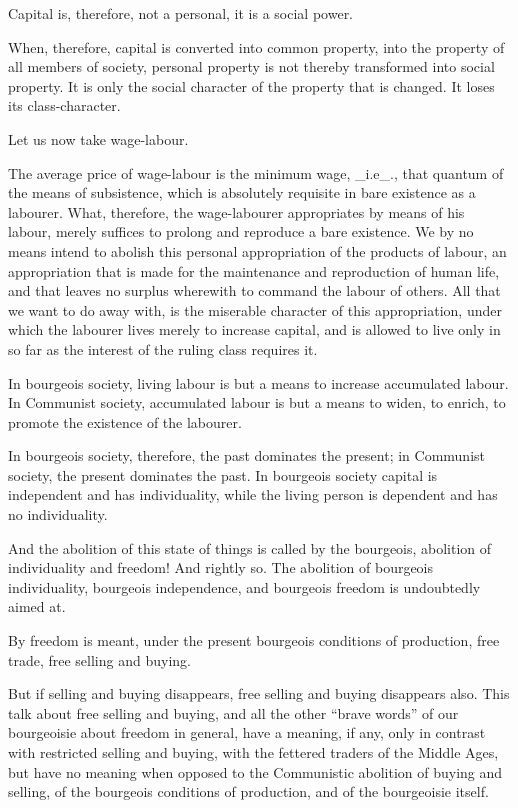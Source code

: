 Capital is, therefore, not a personal, it is a social power.

When, therefore, capital is converted into common property, into the
property of all members of society, personal property is not thereby
transformed into social property. It is only the social character of
the property that is changed. It loses its class-character.

Let us now take wage-labour.

The average price of wage-labour is the minimum wage, _i.e_., that
quantum of the means of subsistence, which is absolutely requisite in
bare existence as a labourer. What, therefore, the wage-labourer
appropriates by means of his labour, merely suffices to prolong and
reproduce a bare existence. We by no means intend to abolish this
personal appropriation of the products of labour, an appropriation that
is made for the maintenance and reproduction of human life, and that
leaves no surplus wherewith to command the labour of others. All that
we want to do away with, is the miserable character of this
appropriation, under which the labourer lives merely to increase
capital, and is allowed to live only in so far as the interest of the
ruling class requires it.

In bourgeois society, living labour is but a means to increase
accumulated labour. In Communist society, accumulated labour is but a
means to widen, to enrich, to promote the existence of the labourer.

In bourgeois society, therefore, the past dominates the present; in
Communist society, the present dominates the past. In bourgeois society
capital is independent and has individuality, while the living person
is dependent and has no individuality.

And the abolition of this state of things is called by the bourgeois,
abolition of individuality and freedom! And rightly so. The abolition
of bourgeois individuality, bourgeois independence, and bourgeois
freedom is undoubtedly aimed at.

By freedom is meant, under the present bourgeois conditions of
production, free trade, free selling and buying.

But if selling and buying disappears, free selling and buying
disappears also. This talk about free selling and buying, and all the
other “brave words” of our bourgeoisie about freedom in general, have a
meaning, if any, only in contrast with restricted selling and buying,
with the fettered traders of the Middle Ages, but have no meaning when
opposed to the Communistic abolition of buying and selling, of the
bourgeois conditions of production, and of the bourgeoisie itself.

